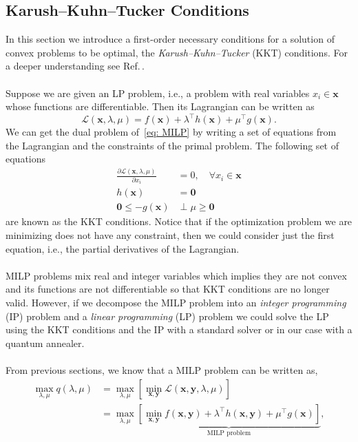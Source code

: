 \subsection{Karush–Kuhn–Tucker Conditions}
In this section we introduce a first-order necessary conditions for a solution of convex problems to be optimal, the \textit{Karush–Kuhn–Tucker} (KKT) conditions. For a deeper understanding see Ref.\,\cite{Boyd2004}.\\\\
Suppose we are given an LP problem, i.e., a problem with real variables $x_{i}\in\mathbf{x}$ whose functions are differentiable. Then its Lagrangian can be written as
\begin{equation}
    \mathcal{L}(\mathbf{x}, \lambda, \mu) = f(\mathbf{x}) + \lambda^{\intercal}h(\mathbf{x}) + \mu^{\intercal}g(\mathbf{x}).
\end{equation}
We can get the dual problem of \,\eqref{eq: MILP} by writing a set of equations from the Lagrangian and the constraints of the primal problem. The following set of equations 
\begin{align}
    \frac{\partial \mathcal{L}(\mathbf{x},\lambda, \mu)}{\partial x_{i}} &= 0, \quad  \forall x_{i} \in \mathbf{x} \\
    h(\mathbf{x}) &= \mathbf{0} \\
    \mathbf{0}\leq - g(\mathbf{x})&\perp \mu \geq \mathbf{0} 
\end{align}
are known as the KKT conditions. Notice that if the optimization problem we are minimizing does not have any constraint, then we could consider just the first equation, i.e., the partial derivatives of the Lagrangian.\\\\
MILP problems mix real and integer variables which implies they are not convex and its functions are not differentiable so that KKT conditions are no longer valid. However, if we decompose the MILP problem into an \textit{integer programming} (IP) problem and a \textit{linear programming} (LP) problem we could solve the LP using the KKT conditions and the IP with a standard solver or in our case with a quantum annealer.\\\\
From previous sections, we know that a MILP problem can be written as,
\begin{align}
    \max_{\lambda,\mu} q(\lambda,\mu) &=\max_{\lambda,\mu}\left[\min_{\mathbf{x},\mathbf{y}}\mathcal{L}(\mathbf{x}, \mathbf{y},\lambda,\mu)\right] \\
    &= \max_{\lambda,\mu}\underbrace{\left[\min_{\mathbf{x}, \mathbf{y}}f(\mathbf{x}, \mathbf{y}) + \lambda^{\intercal}h(\mathbf{x}, \mathbf{y}) + \mu^{\intercal}g(\mathbf{x})\right]}_{\textrm{MILP problem}} ,
\end{align}
